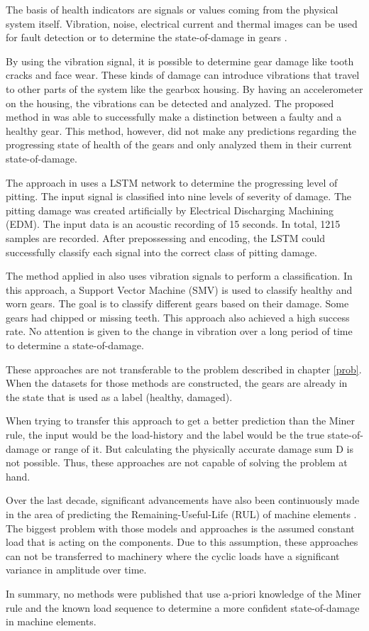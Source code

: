 The basis of health indicators are signals or values coming from the physical system itself. Vibration, noise, electrical current and thermal images can be used for fault detection or to determine the state-of-damage in gears \cite{Prav,KaraACUSTIC,Medina,Kara}.

By using the vibration signal, it is possible to determine gear damage like tooth cracks and face wear. These kinds of damage can introduce vibrations that travel to other parts of the system like the gearbox housing. By having an accelerometer on the housing, the vibrations can be detected and analyzed. The proposed method in \cite{Prav} was able to successfully make a distinction between a faulty and a healthy gear. This method, however, did not make any predictions regarding the progressing state of health of the gears and only analyzed them in their current state-of-damage. 

The approach in \cite{Medina} uses a LSTM network to determine the progressing level of pitting. The input signal is classified into nine levels of severity of damage. The pitting damage was created artificially by Electrical Discharging Machining (EDM). The input data is an acoustic recording of 15 seconds. In total, 1215 samples are recorded. After prepossessing and encoding, the LSTM could successfully classify each signal into the correct class of pitting damage.

The method applied in \cite{RTiwari} also uses vibration signals to perform a classification. In this approach, a Support Vector Machine (SMV) is used to classify healthy and worn gears. The goal is to classify different gears based on their damage. Some gears had chipped or missing teeth. This approach also achieved a high success rate. No attention is given to the change in vibration over a long period of time to determine a state-of-damage. 


These approaches are not transferable to the problem described in chapter \ref{prob}. When the datasets for those methods are constructed, the gears are already in the state that is used as a label (healthy, damaged).

When trying to transfer this approach to get a better prediction than the Miner rule, the input would be the load-history and the label would be the true state-of-damage or range of it. But calculating the physically accurate damage sum D is not possible. Thus, these approaches are not capable of solving the problem at hand. 

Over the last decade, significant advancements have also been continuously made in the area of predicting the Remaining-Useful-Life (RUL) of machine elements \cite{Deutsch,He,Yan}.
The biggest problem with those models and approaches is the assumed constant load that is acting on the components. Due to this assumption, these approaches can not be transferred to machinery where the cyclic loads have a significant variance in amplitude over time.

In summary, no methods were published that use a-priori knowledge of the Miner rule and the known load sequence to determine a more confident state-of-damage in machine elements.

\afterpage{\null\newpage}
